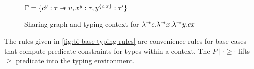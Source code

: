 \begin{figure}[h]
  \begin{framed}\centering
    \begin{minipage}{0.3\linewidth}
  \end{minipage}
  \begin{minipage}{0.4\linewidth}
    $\Gamma = \{ c^{y}:\tau \mathrel{-\mkern-6mu*} \upsilon, x^{y}:\tau, y^{\{c,x\}}:\tau' \}$
  \end{minipage}
  \end{framed}
  \caption{Sharing graph and typing context for $\lambda^{\mathrel{-\mkern-6mu*}} c. \lambda^{\mathrel{-\mkern-6mu*}}  x. \lambda^{\twoheadrightarrow}y. c x$}
  \label{fig:example-sharing-graph}
\end{figure}

The rules given in \cref{fig:bi-base-typing-rules}
are convenience rules for base cases that compute predicate constraints for types within a context.
The $P \mid \cdot \geq \cdot$ lifts $\geq$ predicate into the typing environment.

